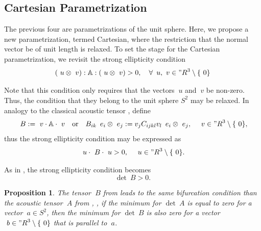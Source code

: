 \documentclass[12pt]{article}
\newtheorem{proposition}{Proposition}
\numberwithin{equation}{section}
\begin{document}
\subsection{Cartesian Parametrization}
\label{subsec:Cartesian}

The previous four are parametrizations of the unit sphere. Here, we
propose a new parametrization, termed Cartesian, where the restriction
that the normal vector be of unit length is relaxed.  To set the stage
for the Cartesian parametrization, we revisit the strong ellipticity
condition
\begin{equation}
  (~u \otimes ~v) : \mathbb{A} : (~u \otimes ~v) > 0,
  \quad
  \forall \, ~u, ~v \in {"R}^3 \setminus \{~0\}
\end{equation}

Note that this condition only requires that the vectors $~u$ and $~v
$ be non-zero. Thus, the condition that they belong to the unit sphere
$S^2$ may be relaxed. In analogy to the classical acoustic tensor
, define
\begin{equation} \label{eq:Cartesian-acoustic-tensor}
  ~B := ~v \cdot \mathbb{A} \cdot ~v
  \quad \text{or} \quad
  B_{ik} \, ~e_i \otimes ~e_j := v_j C_{ijkl} v_l  \, ~e_i \otimes ~e_j,
  \quad
  ~v \in {"R}^3 \setminus \{~0\},
\end{equation}
thus the strong ellipticity condition may be expressed as
\begin{equation} \label{eq:Cartesian-acoustic-ellipticity}
  ~u \cdot ~B \cdot ~u > 0,
  \quad
  ~u \in {"R}^3 \setminus \{~0\}.
\end{equation}

As in , the strong ellipticity
condition becomes
\begin{equation} \label{Cartesian-acoustic-determinant}
  \det ~B > 0.
\end{equation}

\begin{proposition}
  The tensor $~B$ from  leads to
  the same bifurcation condition than the acoustic tensor $~A$ from
  , \ie, if the minimum for $\det ~A$ is
  equal to zero for a vector $~a \in S^2$, then the minimum for $\det
  ~B$ is also zero for a vector $~b \in {"R}^3 \setminus \{~0\}$ that
  is parallel to $~a$.
\end{proposition}
\end{document}
